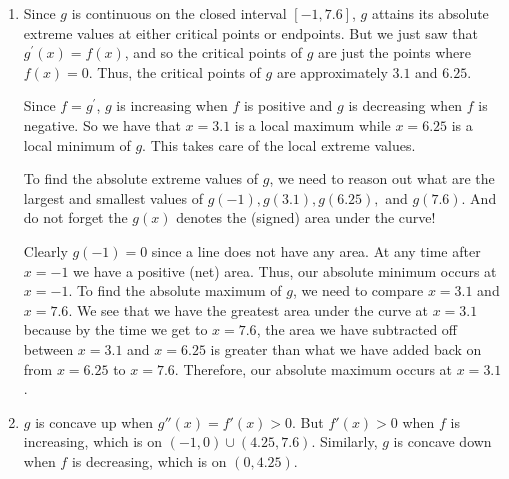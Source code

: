 \documentclass[handout,nooutcomes]{ximera}
\begin{document}
\begin{problem}
\begin{enumerate}
\begin{freeResponse}
\begin{enumerate}
			\item  Since $g$ is continuous on the closed interval $[-1,7.6]$, $g$ attains its absolute extreme values at either critical points or endpoints.  
			But we just saw that $g^\prime(x) = f(x)$, and so the critical points of $g$ are just the points where $f(x) = 0$.  
			Thus, the critical points of $g$ are approximately $3.1$ and $6.25$.
			
			Since $f = g^\prime$, $g$ is increasing when $f$ is positive and $g$ is decreasing when $f$ is negative.  
			So we have that $x=3.1$ is a local maximum while $x=6.25$ is a local minimum of $g$.  
			This takes care of the local extreme values.  
			
			To find the absolute extreme values of $g$, we need to reason out what are the largest and smallest values of $g(-1), g(3.1), g(6.25),$ and $g(7.6)$.  
			And do not forget the $g(x)$ denotes the (signed) area under the curve!  
			
			Clearly $g(-1) = 0$ since a line does not have any area.  
			At any time after $x=-1$ we have a positive (net) area.  
			Thus, our absolute minimum occurs at $x=-1$.
			To find the absolute maximum of $g$, we need to compare $x=3.1$ and $x=7.6$. 
			We see that we have the greatest area under the curve at $x=3.1$ because 
			by the time we get to $x=7.6$, the area we have subtracted off between $x=3.1$ and $x=6.25$ is greater than 
			what we have added back on from $x=6.25$ to $x=7.6$.  
			Therefore, our absolute maximum occurs at $x=3.1$.  
			
			
			\item  $g$ is concave up when $g''(x) = f'(x) > 0$.  But $f'(x) > 0$ when $f$ is increasing, which is on $(-1,0) \cup (4.25,7.6)$.  
			Similarly, $g$ is concave down when $f$ is decreasing, which is on $(0,4.25)$.  
			
			\end{enumerate}
		\end{freeResponse}
		
		
		
	\end{enumerate}

		
		
		

\end{problem}
	
	
	
	
	
	
	
	
			
			
\end{document}
